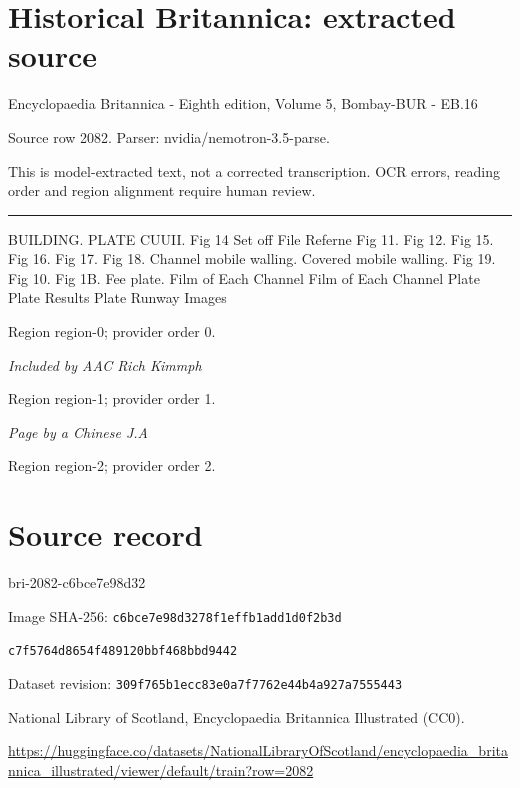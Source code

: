 \documentclass[11pt]{article}
\begin{document}
\section*{Historical Britannica: extracted source}
Encyclopaedia Britannica - Eighth edition, Volume 5, Bombay-BUR - EB.16\par
{\small Source row 2082. Parser: nvidia/nemotron-3.5-parse.\par}
{\small This is model-extracted text, not a corrected transcription. OCR errors, reading order and region alignment require human review.\par}
\hrule\medskip
BUILDING.
PLATE CUUII.
Fig 14
Set off
File
Referne
Fig 11.
Fig 12.
Fig 15.
Fig 16.
Fig 17.
Fig 18.
Channel mobile walling.
Covered mobile walling.
Fig 19.
Fig 10.
Fig 1B.
Fee plate.
Film of Each Channel
Film of Each Channel
Plate
Plate
Results
Plate
Runway Images
\par

{\scriptsize\color{gray} Region region-0; provider order 0.\par}
\medskip

{\small\itshape Included by AAC Rich Kimmph\par}

{\scriptsize\color{gray} Region region-1; provider order 1.\par}
\medskip

{\small\itshape Page by a Chinese J.A\par}

{\scriptsize\color{gray} Region region-2; provider order 2.\par}
\medskip
\newpage\section*{Source record}
bri-2082-c6bce7e98d32\par
Image SHA-256: \texttt{c6bce7e98d3278f1effb1add1d0f2b3d}\par\texttt{c7f5764d8654f489120bbf468bbd9442}\par
Dataset revision: \texttt{309f765b1ecc83e0a7f7}\texttt{762e44b4a927a7555443}\par
National Library of Scotland, Encyclopaedia Britannica Illustrated (CC0).\par
\url{https://huggingface.co/datasets/NationalLibraryOfScotland/encyclopaedia_britannica_illustrated/viewer/default/train?row=2082}
\end{document}
